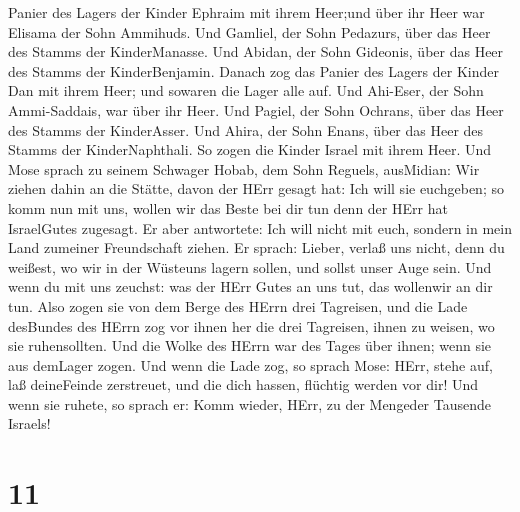 Panier des Lagers der Kinder Ephraim mit ihrem Heer;und über ihr Heer
war Elisama der Sohn Ammihuds.  Und Gamliel, der Sohn
Pedazurs, über das Heer des Stamms der KinderManasse.  Und
Abidan, der Sohn Gideonis, über das Heer des Stamms der KinderBenjamin.
 Danach zog das Panier des Lagers der Kinder Dan mit ihrem
Heer; und sowaren die Lager alle auf. Und Ahi-Eser, der Sohn
Ammi-Saddais, war über ihr Heer.  Und Pagiel, der Sohn
Ochrans, über das Heer des Stamms der KinderAsser.  Und
Ahira, der Sohn Enans, über das Heer des Stamms der KinderNaphthali.
 So zogen die Kinder Israel mit ihrem Heer. 
Und Mose sprach zu seinem Schwager Hobab, dem Sohn Reguels, ausMidian:
Wir ziehen dahin an die Stätte, davon der HErr gesagt hat: Ich will sie
euchgeben; so komm nun mit uns, wollen wir das Beste bei dir tun denn
der HErr hat IsraelGutes zugesagt.  Er aber antwortete: Ich
will nicht mit euch, sondern in mein Land zumeiner Freundschaft ziehen.
 Er sprach: Lieber, verlaß uns nicht, denn du weißest, wo
wir in der Wüsteuns lagern sollen, und sollst unser Auge sein.
 Und wenn du mit uns zeuchst: was der HErr Gutes an uns
tut, das wollenwir an dir tun.  Also zogen sie von dem
Berge des HErrn drei Tagreisen, und die Lade desBundes des HErrn zog vor
ihnen her die drei Tagreisen, ihnen zu weisen, wo sie ruhensollten.
 Und die Wolke des HErrn war des Tages über ihnen; wenn sie
aus demLager zogen.  Und wenn die Lade zog, so sprach Mose:
HErr, stehe auf, laß deineFeinde zerstreuet, und die dich hassen,
flüchtig werden vor dir!  Und wenn sie ruhete, so sprach
er: Komm wieder, HErr, zu der Mengeder Tausende Israels!

\hypertarget{section-10}{%
\section{11}\label{section-10}}

